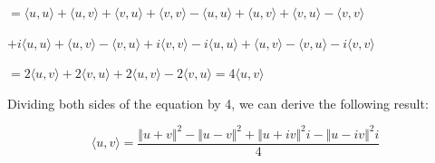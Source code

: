 \documentclass[fleqn]{article}
\begin{document}
\begin{enumerate}[nolistsep]
				$ = \langle u, u \rangle + \langle u, v \rangle + \langle v, u \rangle + \langle v, v \rangle - \langle u, u \rangle + \langle u, v \rangle + \langle v, u \rangle - \langle v, v \rangle$
				
				$ + i\langle u, u \rangle + \langle u, v \rangle - \langle v, u \rangle + i\langle v, v \rangle - i\langle u, u \rangle + \langle u, v \rangle - \langle v, u \rangle - i\langle v, v \rangle$
				
				$ = 2\langle u, v \rangle + 2\langle v, u \rangle + 2\langle u, v \rangle - 2\langle v, u \rangle = 4\langle u, v \rangle$
				
				\pagebreak
				Dividing both sides of the equation by 4, we can derive the following result:
				
				\begin{equation*}
					\langle u, v \rangle = \frac{{\Vert u + v \Vert}^2 - {\Vert u - v \Vert}^2 + {\Vert u + iv \Vert}^2i - {\Vert u - iv \Vert}^2i}{4}
				\end{equation*}
	\end{enumerate}
\end{document}
